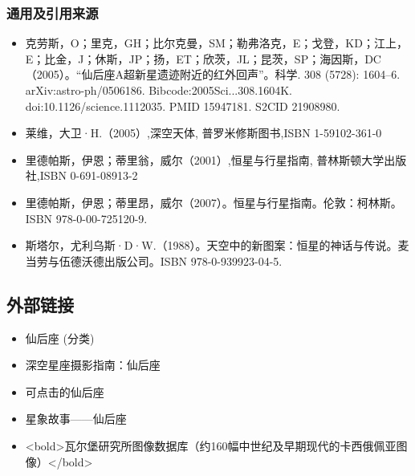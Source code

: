 \subsubsection{通用及引用来源}
\begin{itemize}
\item 克劳斯，O；里克，GH；比尔克曼，SM；勒弗洛克，E；戈登，KD；江上，E；比金，J；休斯，JP；扬，ET；欣茨，JL；昆茨，SP；海因斯，DC（2005）。“仙后座A超新星遗迹附近的红外回声”。科学. 308 (5728): 1604–6. arXiv:astro-ph/0506186. Bibcode:2005Sci...308.1604K. doi:10.1126/science.1112035. PMID 15947181. S2CID 21908980.
\item 莱维，大卫·H.（2005）,深空天体, 普罗米修斯图书,ISBN 1-59102-361-0
\item 里德帕斯，伊恩；蒂里翁，威尔（2001）,恒星与行星指南, 普林斯顿大学出版社,ISBN 0-691-08913-2
\item 里德帕斯，伊恩；蒂里昂，威尔（2007）。恒星与行星指南。伦敦：柯林斯。ISBN 978-0-00-725120-9.
\item 斯塔尔，尤利乌斯·D·W.（1988）。天空中的新图案：恒星的神话与传说。麦当劳与伍德沃德出版公司。ISBN 978-0-939923-04-5.
\end{itemize}
\subsection{外部链接}
\begin{itemize}
\item 仙后座 (分类)
\item 深空星座摄影指南：仙后座
\item 可点击的仙后座
\item 星象故事——仙后座
\item <bold>瓦尔堡研究所图像数据库（约160幅中世纪及早期现代的卡西俄佩亚图像）</bold>
\end{itemize}